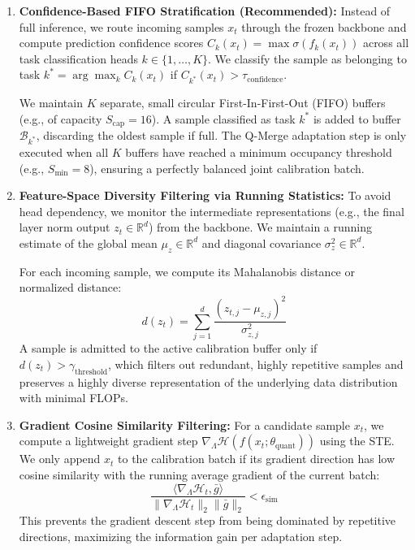 \begin{enumerate}
    \item \textbf{Confidence-Based FIFO Stratification (Recommended):}
    Instead of full inference, we route incoming samples $x_t$ through the frozen backbone and compute prediction confidence scores $C_k(x_t) = \max \sigma(f_k(x_t))$ across all task classification heads $k \in \{1, \dots, K\}$. We classify the sample as belonging to task $k^* = \arg\max_k C_k(x_t)$ if $C_{k^*}(x_t) > \tau_{\text{confidence}}$. 
    
    We maintain $K$ separate, small circular First-In-First-Out (FIFO) buffers (e.g., of capacity $S_{\text{cap}} = 16$). A sample classified as task $k^*$ is added to buffer $\mathcal{B}_{k^*}$, discarding the oldest sample if full. The Q-Merge adaptation step is only executed when all $K$ buffers have reached a minimum occupancy threshold (e.g., $S_{\text{min}} = 8$), ensuring a perfectly balanced joint calibration batch.
    
    \item \textbf{Feature-Space Diversity Filtering via Running Statistics:}
    To avoid head dependency, we monitor the intermediate representations (e.g., the final layer norm output $z_t \in \mathbb{R}^d$) from the backbone. We maintain a running estimate of the global mean $\mu_z \in \mathbb{R}^d$ and diagonal covariance $\sigma^2_z \in \mathbb{R}^d$. 
    
    For each incoming sample, we compute its Mahalanobis distance or normalized distance:
    \begin{equation}
        d(z_t) = \sum_{j=1}^d \frac{(z_{t,j} - \mu_{z, j})^2}{\sigma^2_{z,j}}
    \end{equation}
    A sample is admitted to the active calibration buffer only if $d(z_t) > \gamma_{\text{threshold}}$, which filters out redundant, highly repetitive samples and preserves a highly diverse representation of the underlying data distribution with minimal FLOPs.
    
    \item \textbf{Gradient Cosine Similarity Filtering:}
    For a candidate sample $x_t$, we compute a lightweight gradient step $\nabla_{\Lambda} \mathcal{H}(f(x_t; \theta_{\text{quant}}))$ using the STE. We only append $x_t$ to the calibration batch if its gradient direction has low cosine similarity with the running average gradient of the current batch:
    \begin{equation}
        \frac{\langle \nabla_{\Lambda} \mathcal{H}_t, \bar{g} \rangle}{\|\nabla_{\Lambda} \mathcal{H}_t\|_2 \|\bar{g}\|_2} < \epsilon_{\text{sim}}
    \end{equation}
    This prevents the gradient descent step from being dominated by repetitive directions, maximizing the information gain per adaptation step.
\end{enumerate}

